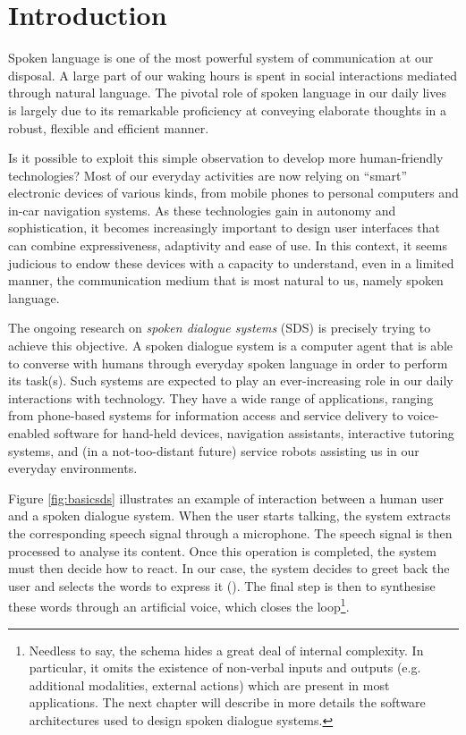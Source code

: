 
\chapter{Introduction}

Spoken language is one of the most powerful system of communication at our disposal. A large part of our waking hours is spent in social interactions mediated through natural language.  The pivotal role of spoken language in our daily lives is largely due to its remarkable proficiency at conveying elaborate thoughts in a robust, flexible and efficient manner. 

Is it possible to exploit this simple observation to develop more human-friendly technologies? Most of our everyday activities are now relying on ``smart'' electronic devices of various kinds, from mobile phones to personal computers and in-car navigation systems. As these technologies gain in autonomy and sophistication, it becomes increasingly important to design user interfaces that can combine expressiveness, adaptivity and ease of use. In this context, it seems judicious to endow these devices with a capacity to understand, even in a limited manner, the communication medium that is most natural to us, namely spoken language.  

The ongoing research on \textit{spoken dialogue systems} (SDS) is precisely trying to achieve this objective. A spoken dialogue system is a computer agent that is able to converse with humans through everyday spoken language in order to perform its task(s). Such systems are expected to play an ever-increasing role in our daily interactions with technology. They have a wide range of applications, ranging from phone-based systems for information access and service delivery to voice-enabled software for hand-held devices, navigation assistants, interactive tutoring systems, and (in a not-too-distant future) service robots assisting us in our everyday environments.

Figure \ref{fig:basicsds} illustrates an example of interaction between a human user and a spoken dialogue system. When the user starts talking, the system extracts the corresponding speech signal through a microphone.  The speech signal is then processed to analyse its content.  Once this operation is completed, the system must then decide how to react.  In our case, the system decides to greet back the user and selects the words to express it (). The final step is then to synthesise these words through an artificial voice, which closes the loop\footnote{ Needless to say, the schema hides a great deal of internal complexity.  In particular, it omits the existence of non-verbal inputs and outputs (e.g. additional modalities, external actions) which are present in most applications.  The next chapter will describe in more details the software architectures used to design spoken dialogue systems.}.

